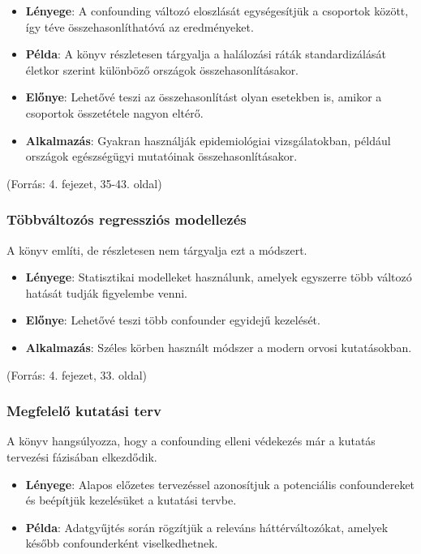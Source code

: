 \documentclass[a4paper,12pt]{article}
\begin{document}
\begin{itemize}
\item \textbf{Lényege}: A confounding változó eloszlását egységesítjük a csoportok között, így téve összehasonlíthatóvá az eredményeket.
\item \textbf{Példa}: A könyv részletesen tárgyalja a halálozási ráták standardizálását életkor szerint különböző országok összehasonlításakor.
\item \textbf{Előnye}: Lehetővé teszi az összehasonlítást olyan esetekben is, amikor a csoportok összetétele nagyon eltérő.
\item \textbf{Alkalmazás}: Gyakran használják epidemiológiai vizsgálatokban, például országok egészségügyi mutatóinak összehasonlításakor.
\end{itemize}
(Forrás: 4. fejezet, 35-43. oldal)

\subsubsection{Többváltozós regressziós modellezés}

A könyv említi, de részletesen nem tárgyalja ezt a módszert.

\begin{itemize}
\item \textbf{Lényege}: Statisztikai modelleket használunk, amelyek egyszerre több változó hatását tudják figyelembe venni.
\item \textbf{Előnye}: Lehetővé teszi több confounder egyidejű kezelését.
\item \textbf{Alkalmazás}: Széles körben használt módszer a modern orvosi kutatásokban.
\end{itemize}

(Forrás: 4. fejezet, 33. oldal)

\subsubsection{Megfelelő kutatási terv}

A könyv hangsúlyozza, hogy a confounding elleni védekezés már a kutatás tervezési fázisában elkezdődik.

\begin{itemize}
\item \textbf{Lényege}: Alapos előzetes tervezéssel azonosítjuk a potenciális confoundereket és beépítjük kezelésüket a kutatási tervbe.
\item \textbf{Példa}: Adatgyűjtés során rögzítjük a releváns háttérváltozókat, amelyek később confounderként viselkedhetnek.
\end{itemize}
\end{document}

